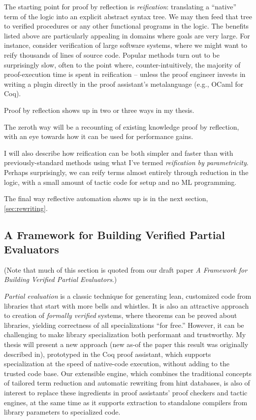 \documentclass[twoside]{article}
\begin{document}
The starting point for proof by reflection is \emph{reification}: translating a ``native'' term of the logic into an explicit abstract syntax tree.
We may then feed that tree to verified procedures or any other functional programs in the logic.
The benefits listed above are particularly appealing in domains where goals are very large.
For instance, consider verification of large software systems, where we might want to reify thousands of lines of source code.
Popular methods turn out to be surprisingly slow, often to the point where, counter-intuitively, the majority of proof-execution time is spent in reification -- unless the proof engineer invests in writing a plugin directly in the proof assistant's metalanguage (e.g., OCaml for Coq).

Proof by reflection shows up in two or three ways in my thesis.

The zeroth way will be a recounting of existing knowledge proof by reflection, with an eye towards how it can be used for performance gains.

I will also describe how reification can be both simpler and faster than with previously-standard methods using what I've termed \emph{reification by parametricity}.
Perhaps surprisingly, we can reify terms almost entirely through reduction in the logic, with a small amount of tactic code for setup and no ML programming.

The final way reflective automation shows up is in the next section, \autoref{sec:rewriting}.

\subsection{A Framework for Building Verified Partial Evaluators} \label{sec:rewriting}

(Note that much of this section is quoted from our draft paper \emph{A Framework for Building Verified Partial Evaluators}.)

\emph{Partial evaluation} is a classic technique for generating lean, customized code from libraries that start with more bells and whistles.
It is also an attractive approach to creation of \emph{formally verified} systems, where theorems can be proved about libraries, yielding correctness of all specializations ``for free.''
However, it can be challenging to make library specialization both performant and trustworthy.
My thesis will present a new approach (new as-of the paper this result was originally described in), prototyped in the Coq proof assistant, which supports specialization at the speed of native-code execution, without adding to the trusted code base.
Our extensible engine, which combines the traditional concepts of tailored term reduction and automatic rewriting from hint databases, is also of interest to replace these ingredients in proof assistants' proof checkers and tactic engines, at the same time as it supports extraction to standalone compilers from library parameters to specialized code.
\end{document}
